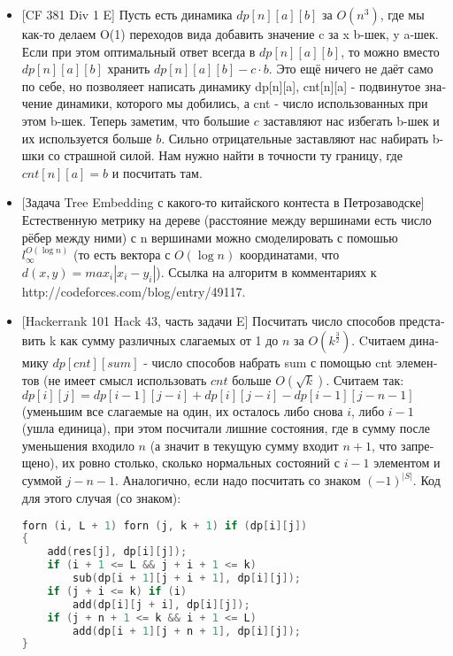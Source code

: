 \begin{itemize}
    \item 
\foreignlanguage{russian}{[CF 381 Div 1 E] Пусть есть динамика $dp[n][a][b]$ за $O(n^3)$, где мы как-то делаем O(1)
переходов вида добавить значение c за x b-шек, y a-шек. Если при этом оптимальный ответ
всегда в $dp[n][a][b]$, то можно вместо $dp[n][a][b]$ хранить $dp[n][a][b] - c \cdot b$. Это ещё
ничего не даёт само по себе, но позволяеет написать динамику dp[n][a], cnt[n][a] -
подвинутое значение динамики, которого мы добились, а cnt - число использованных при
этом b-шек. Теперь заметим, что большие $c$ заставляют нас избегать b-шек и их используется
больше $b$. Сильно отрицательные заставляют нас набирать b-шки со страшной силой. Нам нужно
найти в точности ту границу, где $cnt[n][a] = b$ и посчитать там.}

\item
\foreignlanguage{russian}{[Задача Tree Embedding с какого-то китайского контеста в Петрозаводске] Естественную
метрику на дереве (расстояние между вершинами есть число рёбер между ними) с n вершинами
можно смоделировать с помошью $l_{\infty}^{O(\log{n})}$ (то есть вектора с $O(\log{n})$ координатами,
что $d(x, y) = max_i |x_i - y_i|$). Ссылка на алгоритм в комментариях
к} http://codeforces.com/blog/entry/49117.

\item
\foreignlanguage{russian}{
[Hackerrank 101 Hack 43, часть задачи E]
Посчитать число способов представить k как сумму различных слагаемых от 1 до $n$ за $O(k^{\frac{3}{2}})$.
Cчитаем динамику $dp[cnt][sum]$ - число способов набрать sum с помощью cnt элементов
(не имеет смысл использовать $cnt$ больше $O(\sqrt{k})$. Считаем так: $dp[i][j] =
dp[i - 1][j - i] + dp[i][j - i] - dp[i - 1][j - n - 1]$ (уменьшим все слагаемые на один, их
осталось либо снова $i$, либо $i - 1$ (ушла единица), при этом посчитали лишние состояния,
где в сумму после уменьшения входило $n$ (а значит в текущую сумму входит $n+1$, что запрещено),
их ровно столько, сколько нормальных состояний с $i - 1$ элементом и суммой $j - n - 1$.
Аналогично, если надо посчитать со знаком $(-1)^{|S|}$. Код для этого случая (со знаком):}
\begin{lstlisting}[language=c++]
forn (i, L + 1) forn (j, k + 1) if (dp[i][j])
{
	add(res[j], dp[i][j]);
	if (i + 1 <= L && j + i + 1 <= k)
		sub(dp[i + 1][j + i + 1], dp[i][j]);
	if (j + i <= k) if (i)
		add(dp[i][j + i], dp[i][j]);
	if (j + n + 1 <= k && i + 1 <= L)
		add(dp[i + 1][j + n + 1], dp[i][j]);
}
\end{lstlisting}


\end{itemize}
